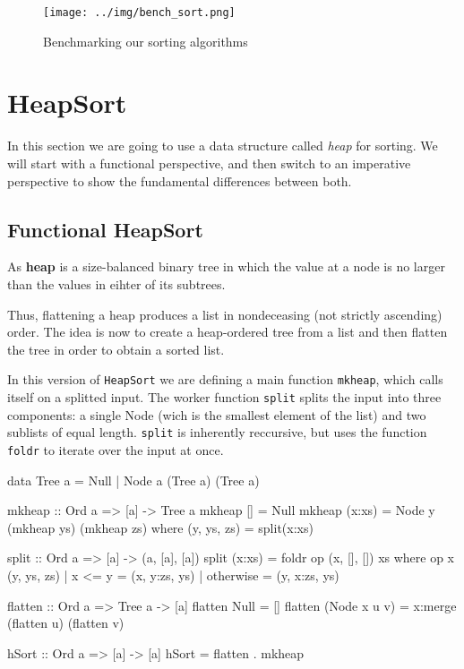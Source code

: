 \begin{figure}[ht]
\centering
\texttt{[image: ../img/bench\_sort.png]}
\caption[Sorting benchmarks]{Benchmarking our sorting algorithms}
\end{figure}

\section{HeapSort}

In this section we are going to use a data structure called \emph{heap} for sorting. We will start with a functional perspective, and then switch to an imperative perspective to show the fundamental differences between both.

\subsection{Functional HeapSort}

\begin{defn}[Heap]
As \textbf{heap} is a size-balanced binary tree in which the value at a node is no larger than the values in eihter of its subtrees.
\end{defn}

Thus, flattening a heap produces a list in nondeceasing (not strictly ascending) order.
The idea is now to create a heap-ordered tree from a list and then flatten the tree in order to obtain a sorted list.

\begin{impl}
In this version of \texttt{HeapSort} we are defining a main function \texttt{mkheap}, which calls itself on a splitted input.
The worker function \texttt{split} splits the input into three components: a single Node (wich is the smallest element of the list) and two sublists of equal length.
\texttt{split} is inherently reccursive, but uses the function \texttt{foldr} to iterate over the input at once.
\end{impl}

\begin{haskellcode}
data Tree a = Null | Node a (Tree a) (Tree a)

mkheap :: Ord a => [a] -> Tree a
mkheap [] = Null
mkheap (x:xs) = Node y (mkheap ys) (mkheap zs)
    where (y, ys, zs) = split(x:xs)

split :: Ord a => [a] -> (a, [a], [a])
split (x:xs) = foldr op (x, [], []) xs
    where op x (y, ys, zs) | x <= y    = (x, y:zs, ys)
                           | otherwise = (y, x:zs, ys)

flatten :: Ord a => Tree a -> [a]
flatten Null = []
flatten (Node x u v) = x:merge (flatten u) (flatten v)

hSort :: Ord a => [a] -> [a]
hSort = flatten . mkheap
\end{haskellcode}


